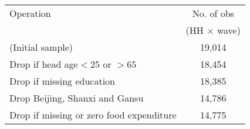 \begin{tabular}{l|c}
\toprule
Operation & No. of obs \\
                  & (HH $\times$ wave) \\
\midrule
 (Initial sample)                                                                                      & 19,014  \\
Drop if head age$<25$ or $>65$                                                         & 18,454      \\
Drop if missing education                                                                      & 18,385      \\
Drop Beijing, Shanxi and Gansu                                                         & 14,786  \\
Drop if missing or zero food expenditure                                       & 14,775      \\
\bottomrule
\end{tabular}